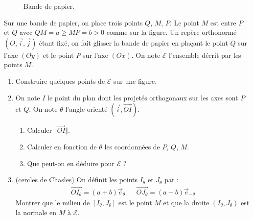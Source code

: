 \begin{figure}
	\begin{center}
	
	\end{center}
\caption{Bande de papier.}
\end{figure} 
Sur une bande de papier, on place trois points $Q$, $M$, $P$. Le point $M$ est entre $P$ et $Q$ avec $QM=a\geq MP=b>0$ comme sur la figure.\newline
Un repère orthonormé $(O,\overrightarrow{i},\overrightarrow{j})$ étant fixé, on fait glisser la bande de papier en plaçant le point $Q$ sur l'axe $(Oy)$ et le point $P$ sur l'axe $(Ox)$. On note $\mathcal E$ l'ensemble décrit par les points $M$.
\begin{enumerate}
    \item Construire quelques points de $\mathcal E$ sur une figure.
    \item On note $I$ le point du plan dont les projetés orthogonaux sur les axes sont $P$ et $Q$. On note  $\theta$ l'angle orienté $(\overrightarrow{i},\overrightarrow{OI})$.
    \begin{enumerate}
       \item Calculer $\Vert \overrightarrow{OI} \Vert$.
       \item  Calculer en fonction de $\theta$ les coordonnées de $P$, $Q$, $M$.
       \item Que peut-on en déduire pour $\mathcal E$ ?
    \end{enumerate}

\item (cercles de Chasles) On définit les points $I_\theta$ et $J_\theta$ par :
\begin{align*}
 \overrightarrow{OI_\theta}=(a+b)\overrightarrow{e}_\theta & &
 \overrightarrow{OJ_\theta}=(a-b)\overrightarrow{e}_{-\theta}
\end{align*}
Montrer que le milieu de $[I_\theta, J_\theta]$ est le point $M$ et que la droite $(I_\theta, J_\theta)$ est la normale en $M$ à $\mathcal E$. 
\end{enumerate}
